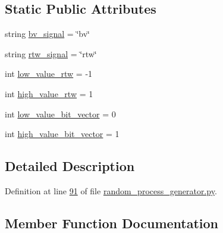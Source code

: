 \subsection*{Static Public Attributes}
\begin{DoxyCompactItemize}
\item 
string \hyperlink{classrandom__process__models_1_1random__process__generator_1_1rand__signal__generator_ab5e9d283e3d5d2a2c6ba58897d208547}{bv\+\_\+signal} = \char`\"{}bv\char`\"{}
\item 
string \hyperlink{classrandom__process__models_1_1random__process__generator_1_1rand__signal__generator_a6628ea9c95a141778e1bb0e8ba8d0845}{rtw\+\_\+signal} = \char`\"{}rtw\char`\"{}
\item 
int \hyperlink{classrandom__process__models_1_1random__process__generator_1_1rand__signal__generator_a5c3b5601f4bbf03559fb7607929f7f7f}{low\+\_\+value\+\_\+rtw} = -\/1
\item 
int \hyperlink{classrandom__process__models_1_1random__process__generator_1_1rand__signal__generator_a71277d93f7a9f93faa86fb40e04e1f19}{high\+\_\+value\+\_\+rtw} = 1
\item 
int \hyperlink{classrandom__process__models_1_1random__process__generator_1_1rand__signal__generator_a68859568af63a4990b97fcfc4a604884}{low\+\_\+value\+\_\+bit\+\_\+vector} = 0
\item 
int \hyperlink{classrandom__process__models_1_1random__process__generator_1_1rand__signal__generator_ada393b856bd4abbd328d3c87fb13e120}{high\+\_\+value\+\_\+bit\+\_\+vector} = 1
\end{DoxyCompactItemize}


\subsection{Detailed Description}


Definition at line \hyperlink{random__process__generator_8py_source_l00091}{91} of file \hyperlink{random__process__generator_8py_source}{random\+\_\+process\+\_\+generator.\+py}.



\subsection{Member Function Documentation}
\hypertarget{classrandom__process__models_1_1random__process__generator_1_1rand__signal__generator_a281d575afed0d10531c7cfaf17df2f5a}{}
